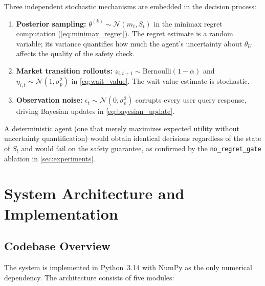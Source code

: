 \documentclass[11pt,letterpaper]{article}
\newcommand{\thetaU}{\theta_U}
\begin{document}
Three independent stochastic mechanisms are embedded in the decision process:
\begin{enumerate}[nosep]
    \item \textbf{Posterior sampling:} $\theta^{(k)} \sim \mathcal{N}(m_t, S_t)$ in the minimax regret computation (\cref{eq:minimax_regret}).  The regret estimate is a random variable; its variance quantifies how much the agent's uncertainty about $\thetaU$ affects the quality of the safety check.
    \item \textbf{Market transition rollouts:} $z_{i,t+1} \sim \mathrm{Bernoulli}(1-\alpha)$ and $\eta_{i,t} \sim \mathcal{N}(1,\sigma_p^2)$ in \cref{eq:wait_value}.  The wait value estimate is stochastic.
    \item \textbf{Observation noise:} $\epsilon_t \sim \mathcal{N}(0, \sigma_\epsilon^2)$ corrupts every user query response, driving Bayesian updates in \cref{eq:bayesian_update}.
\end{enumerate}
A deterministic agent (one that merely maximizes expected utility without uncertainty quantification) would obtain identical decisions regardless of the state of $S_t$ and would fail on the safety guarantee, as confirmed by the \texttt{no\_regret\_gate} ablation in \cref{sec:experiments}.

\section{System Architecture and Implementation}
\label{sec:implementation}

\subsection{Codebase Overview}

The system is implemented in Python~3.14 with NumPy as the only numerical dependency.  The architecture consists of five modules:
\end{document}
